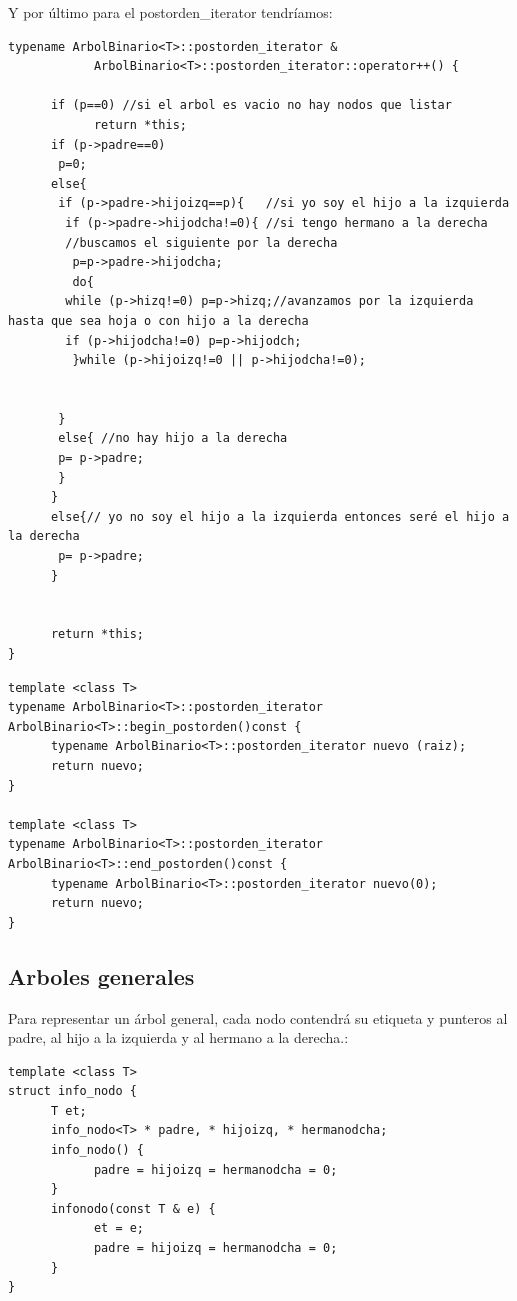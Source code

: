 \documentclass[10pt,a4paper,spanish]{report}
\begin{document}
Y por último para el postorden\_iterator tendríamos:
\begin{verbatim}
typename ArbolBinario<T>::postorden_iterator & 
            ArbolBinario<T>::postorden_iterator::operator++() {

      if (p==0) //si el arbol es vacio no hay nodos que listar
            return *this;
      if (p->padre==0)
       p=0;
      else{
       if (p->padre->hijoizq==p){   //si yo soy el hijo a la izquierda
        if (p->padre->hijodcha!=0){ //si tengo hermano a la derecha
        //buscamos el siguiente por la derecha
         p=p->padre->hijodcha; 
         do{
	    while (p->hizq!=0) p=p->hizq;//avanzamos por la izquierda hasta que sea hoja o con hijo a la derecha
	    if (p->hijodcha!=0) p=p->hijodch;
         }while (p->hijoizq!=0 || p->hijodcha!=0);
                  
            
       }
       else{ //no hay hijo a la derecha
       p= p->padre;
       }
      } 
      else{// yo no soy el hijo a la izquierda entonces seré el hijo a la derecha 
       p= p->padre;
      }
      

      return *this;
}
\end{verbatim}

\begin{verbatim}
template <class T>
typename ArbolBinario<T>::postorden_iterator ArbolBinario<T>::begin_postorden()const {
      typename ArbolBinario<T>::postorden_iterator nuevo (raiz);
      return nuevo;
}

template <class T>
typename ArbolBinario<T>::postorden_iterator ArbolBinario<T>::end_postorden()const {
      typename ArbolBinario<T>::postorden_iterator nuevo(0);
      return nuevo;
}
\end{verbatim}



\subsection{\textcolor[rgb]{0.3,0.4,0.8}Arboles generales}
\noindent
Para representar un árbol general, cada nodo contendrá su etiqueta y punteros al padre, al hijo a la izquierda y al hermano a la derecha.:

\begin{verbatim}
template <class T>
struct info_nodo {
      T et;
      info_nodo<T> * padre, * hijoizq, * hermanodcha;
      info_nodo() {
            padre = hijoizq = hermanodcha = 0;
      }
      infonodo(const T & e) {
            et = e;
            padre = hijoizq = hermanodcha = 0;
      }
}
\end{verbatim}
\end{document}
